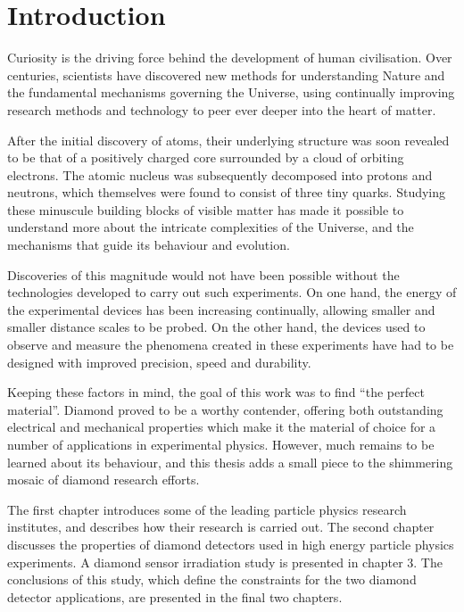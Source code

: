 
\chapter{Introduction}
\label{ch:intro}
Curiosity is the driving force behind the development of human civilisation. Over centuries, scientists have discovered new methods for understanding Nature and the fundamental mechanisms governing the Universe, using continually improving research methods and technology to peer ever deeper into the heart of matter.

After the initial discovery of atoms, their underlying structure was soon revealed to be that of a positively charged core surrounded by a cloud of orbiting electrons. The atomic nucleus was subsequently decomposed into protons and neutrons, which themselves were found to consist of three tiny quarks. Studying these minuscule building blocks of visible matter has made it possible to understand more about the intricate complexities of the Universe, and the mechanisms that guide its behaviour and evolution.

Discoveries of this magnitude would not have been possible without the technologies developed to carry out such experiments. On one hand, the energy of the experimental devices has been increasing continually, allowing smaller and smaller distance scales to be probed. On the other hand, the devices used to observe and measure the phenomena created in these experiments have had to be designed with improved precision, speed and durability. 

Keeping these factors in mind, the goal of this work was to find ``the perfect material''. Diamond proved to be a worthy contender, offering both outstanding electrical and mechanical properties which make it the material of choice for a number of applications in experimental physics. However, much remains to be learned about its behaviour, and this thesis adds a small piece to the shimmering mosaic of diamond research efforts.

The first chapter introduces some of the leading particle physics research institutes, and describes how their research is carried out. The second chapter discusses the properties of diamond detectors used in high energy particle physics experiments. A diamond sensor irradiation study is presented in chapter 3. The conclusions of this study, which define the constraints for the two diamond detector applications, are presented in the final two chapters.




